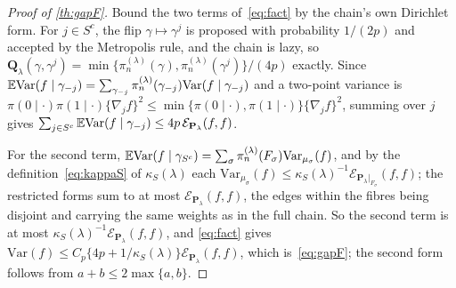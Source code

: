 \begin{proof}[Proof of \cref{th:gapF}]
    Bound the two terms of~\eqref{eq:fact} by the chain's own Dirichlet
    form. For $j\in S^{c}$, the flip $\gamma\mapsto\gamma^{j}$ is proposed
    with probability $1/(2p)$ and accepted by the Metropolis rule, and the
    chain is lazy, so
    $\mathbf{Q}_\lambda(\gamma,\gamma^{j})=\min\{\pi_n^{(\lambda)}(\gamma),
    \pi_n^{(\lambda)}(\gamma^{j})\}/(4p)$ exactly. Since
    $\mathbb{E}\mathrm{Var}(f\mid\gamma_{-j})=\sum_{\gamma_{-j}}
    \pi_n^{(\lambda)}(\gamma_{-j})\mathrm{Var}(f\mid\gamma_{-j})$ and a
    two-point variance is
    $\pi(0\mid\cdot)\pi(1\mid\cdot)\{\nabla_jf\}^{2}\leq
    \min\{\pi(0\mid\cdot),\pi(1\mid\cdot)\}\{\nabla_jf\}^{2}$, summing over
    $j$ gives $\sum_{j\in S^{c}}\mathbb{E}\mathrm{Var}(f\mid\gamma_{-j})\leq
    4p\,\mathcal{E}_{\mathbf{P}_\lambda}(f,f)$.

    For the second term, $\mathbb{E}\mathrm{Var}(f\mid\gamma_{S^{c}})=
    \sum_\sigma\pi_n^{(\lambda)}(F_\sigma)\mathrm{Var}_{\mu_\sigma}(f)$, and
    by the definition~\eqref{eq:kappaS} of $\kappa_S(\lambda)$ each
    $\mathrm{Var}_{\mu_\sigma}(f)\leq\kappa_S(\lambda)^{-1}
    \mathcal{E}_{\mathbf{P}_\lambda|_{F_\sigma}}(f,f)$; the restricted forms
    sum to at most $\mathcal{E}_{\mathbf{P}_\lambda}(f,f)$, the edges within
    the fibres being disjoint and carrying the same weights as in the full
    chain. So the second term is at most
    $\kappa_S(\lambda)^{-1}\mathcal{E}_{\mathbf{P}_\lambda}(f,f)$, and
    \eqref{eq:fact} gives $\mathrm{Var}(f)\leq C_p\{4p+1/\kappa_S(\lambda)\}
    \mathcal{E}_{\mathbf{P}_\lambda}(f,f)$, which is~\eqref{eq:gapF}; the
    second form follows from $a+b\leq2\max\{a,b\}$.
\end{proof}

